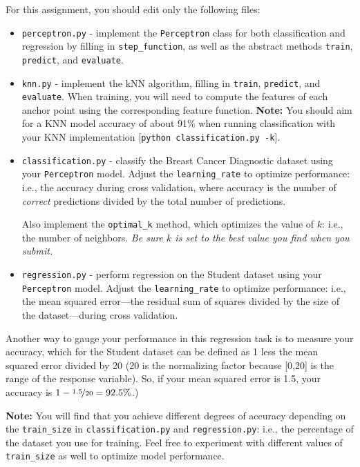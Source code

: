 \documentclass{article}
\begin{document}
For this assignment, you should edit only the following files:

\begin{itemize}
\item \verb|perceptron.py| - implement the \verb|Perceptron| class for both classification and regression by filling in
  \verb|step_function|, as well as the abstract methods \verb|train|, \verb|predict|, and \verb|evaluate|.

\item \verb|knn.py| - implement the kNN algorithm, filling in \verb|train|, \verb|predict|, and \verb|evaluate|. When training, you will need to compute the features of each anchor point using the corresponding feature function.  \textbf{Note:} You should aim for a KNN model accuracy of about 91\% when running classification with your KNN implementation [\verb|python classification.py -k|].

\item \verb|classification.py| - classify the Breast Cancer Diagnostic dataset using your \verb|Perceptron| model.
  Adjust the \verb|learning_rate| to optimize performance: i.e., the accuracy during cross validation,
  where accuracy is the number of \emph{correct\/} predictions divided by the total number of predictions.

  Also implement the \verb|optimal_k| method, which optimizes the value of $k$: i.e., the number of neighbors.
  \emph{Be sure $k$ is set to the best value you find when you submit.}

\item \verb|regression.py| - perform regression on the Student dataset using your \verb|Perceptron| model.
  Adjust the \verb|learning_rate| to optimize performance: i.e., the mean squared error---the
  residual sum of squares divided by the size of the dataset---during cross validation.
\end{itemize}

  Another way to gauge your performance in this regression task is to measure your accuracy,
  which for the Student dataset can be defined as 1 less the mean squared error divided by 20
  (20 is the normalizing factor because [0,20] is the range of the response variable).
  So, if your mean squared error is 1.5, your accuracy is $1 - \nicefrac{1.5}{20} = 92.5\%$.)
  
\textbf{Note:} You will find that you achieve different degrees of accuracy
depending on the \verb|train_size| in \verb|classification.py| and \verb|regression.py|:
i.e., the percentage of the dataset you use for training.
Feel free to experiment with different values of \verb|train_size| as well to optimize model performance.
\end{document}
